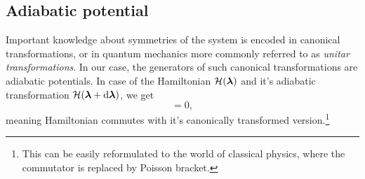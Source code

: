 \subsection{Adiabatic potential}
Important knowledge about symmetries of the system is encoded in canonical transformations, or in quantum mechanics more commonly referred to as \emph{unitar transformations}. In our case, the generators of such canonical transformations are adiabatic potentials. In case of the Hamiltonian $\mathcal{H}({\bm\lambda})$ and it's adiabatic transformation $\mathcal{H}({\bm\lambda}+\mathrm{d} {\bm\lambda})$, we get
\begin{equation}
    [\HH(\llambda),\HH(\llambda+\d \llambda)]=0,
\end{equation}
meaning Hamiltonian commutes with it's canonically transformed version.\footnote{This can be easily reformulated to the world of classical physics, where the commutator is replaced by Poisson bracket.}


